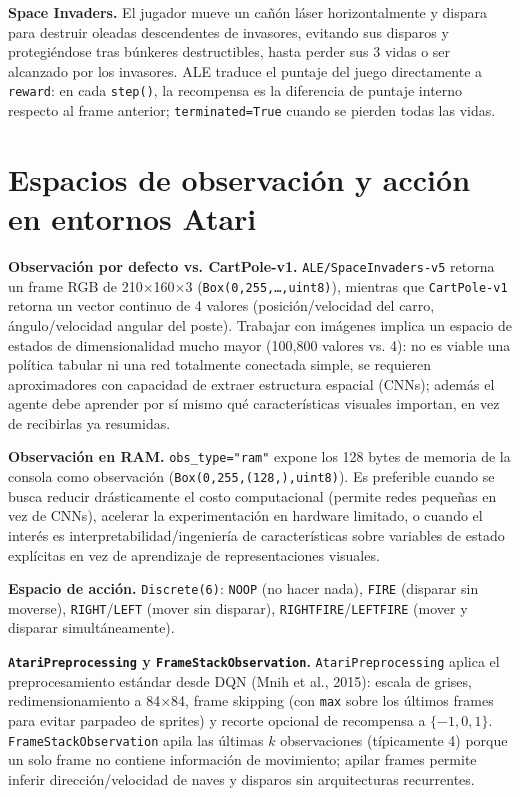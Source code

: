 \documentclass[10pt]{article}
\newcommand{\rhead}[1]{\textbf{#1}}
\begin{document}
\rhead{Space Invaders.} El jugador mueve un cañón láser horizontalmente y dispara para destruir oleadas descendentes de invasores, evitando sus disparos y protegiéndose tras búnkeres destructibles, hasta perder sus 3 vidas o ser alcanzado por los invasores. ALE traduce el puntaje del juego directamente a \texttt{reward}: en cada \texttt{step()}, la recompensa es la diferencia de puntaje interno respecto al frame anterior; \texttt{terminated=True} cuando se pierden todas las vidas.

\section{Espacios de observación y acción en entornos Atari}

\rhead{Observación por defecto vs. CartPole-v1.} \texttt{ALE/SpaceInvaders-v5} retorna un frame RGB de 210$\times$160$\times$3 (\texttt{Box(0,255,\dots,uint8)}), mientras que \texttt{CartPole-v1} retorna un vector continuo de 4 valores (posición/velocidad del carro, ángulo/velocidad angular del poste). Trabajar con imágenes implica un espacio de estados de dimensionalidad mucho mayor (100{,}800 valores vs. 4): no es viable una política tabular ni una red totalmente conectada simple, se requieren aproximadores con capacidad de extraer estructura espacial (CNNs); además el agente debe aprender por sí mismo qué características visuales importan, en vez de recibirlas ya resumidas.

\rhead{Observación en RAM.} \texttt{obs\_type="ram"} expone los 128 bytes de memoria de la consola como observación (\texttt{Box(0,255,(128,),uint8)}). Es preferible cuando se busca reducir drásticamente el costo computacional (permite redes pequeñas en vez de CNNs), acelerar la experimentación en hardware limitado, o cuando el interés es interpretabilidad/ingeniería de características sobre variables de estado explícitas en vez de aprendizaje de representaciones visuales.

\rhead{Espacio de acción.} \texttt{Discrete(6)}: \texttt{NOOP} (no hacer nada), \texttt{FIRE} (disparar sin moverse), \texttt{RIGHT}/\texttt{LEFT} (mover sin disparar), \texttt{RIGHTFIRE}/\texttt{LEFTFIRE} (mover y disparar simultáneamente).

\rhead{\texttt{AtariPreprocessing} y \texttt{FrameStackObservation}.} \texttt{AtariPreprocessing} aplica el preprocesamiento estándar desde DQN (Mnih et al., 2015): escala de grises, redimensionamiento a 84$\times$84, frame skipping (con \texttt{max} sobre los últimos frames para evitar parpadeo de sprites) y recorte opcional de recompensa a $\{-1,0,1\}$. \texttt{FrameStackObservation} apila las últimas $k$ observaciones (t\'{i}picamente 4) porque un solo frame no contiene información de movimiento; apilar frames permite inferir dirección/velocidad de naves y disparos sin arquitecturas recurrentes.
\end{document}
